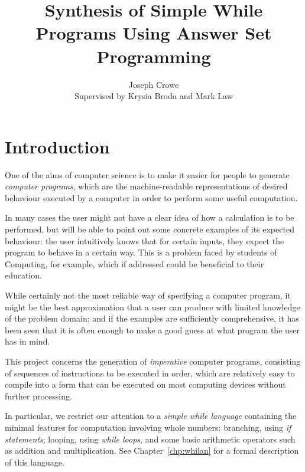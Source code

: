 \documentclass[a4paper,twoside,notitlepage]{report}
\begin{document}
\title{Synthesis of Simple While Programs Using Answer Set Programming}
\author{Joseph Crowe \\ Supervised by Krysia Broda and Mark Law}
\maketitle
\clearpage

\tableofcontents

\chapter{Introduction} \label{chp:intro}

One of the aims of computer science is to make it easier for people to 
generate \emph{computer programs}, which are the machine-readable 
representations of desired behaviour executed by a computer in order to 
perform some useful computation.

\begin{changebar}
In many cases the user might not have a clear idea of how a calculation is 
to be performed, but will be able to point out some concrete examples of 
its expected behaviour: the user intuitively knows that for certain 
inputs, they expect the program to behave in a certain way. This is a 
problem faced by students of Computing, for example, which if addressed 
could be beneficial to their education.

While certainly not the most reliable way of specifying a computer 
program, it might be the best approximation that a user can produce with 
limited knowledge of the problem domain; and if the examples are 
sufficiently comprehensive, it has been seen that it is often enough to 
make a good guess at what program the user has in mind.
\end{changebar}

This project concerns the generation of \emph{imperative} computer 
programs, consisting of sequences of instructions to be executed in order, 
which are relatively easy to compile into a form that can be executed on 
most computing devices without further processing.

In particular, we restrict our attention to a \emph{simple while language} 
containing the minimal features for computation involving whole numbers: 
branching, using \emph{if statements}; looping, using \emph{while loops}, 
and some basic arithmetic operators such as addition and multiplication.
See Chapter~\ref{chp:whilan} for a formal description of this language.
\end{document}
